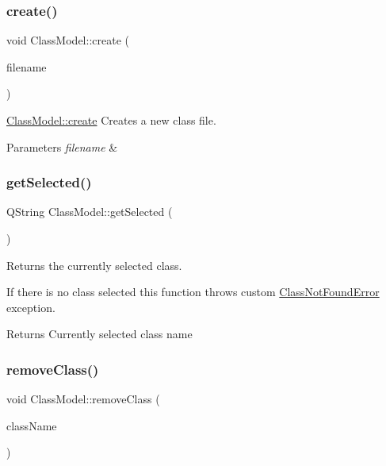 \subsubsection{\texorpdfstring{create()}{create()}}
{\footnotesize\ttfamily void Class\+Model\+::create (\begin{DoxyParamCaption}\item[{const Q\+String \&}]{filename }\end{DoxyParamCaption})}



\hyperlink{classClassModel_afb5c974408ff462e812df971588ea703}{Class\+Model\+::create} Creates a new class file. 


\begin{DoxyParams}{Parameters}
{\em filename} & \\
\hline
\end{DoxyParams}
\mbox{\label{classClassModel_ab7ca25c9d73597d671bfbb1c34f92461}} 
\subsubsection{\texorpdfstring{get\+Selected()}{getSelected()}}
{\footnotesize\ttfamily Q\+String Class\+Model\+::get\+Selected (\begin{DoxyParamCaption}{ }\end{DoxyParamCaption})}



Returns the currently selected class. 

If there is no class selected this function throws custom \hyperlink{classClassNotFoundError}{Class\+Not\+Found\+Error} exception.

\begin{DoxyReturn}{Returns}
Currently selected class name 
\end{DoxyReturn}
\mbox{\label{classClassModel_afe2266d404da4bab25bf193212fed198}} 
\subsubsection{\texorpdfstring{remove\+Class()}{removeClass()}}
{\footnotesize\ttfamily void Class\+Model\+::remove\+Class (\begin{DoxyParamCaption}\item[{const Q\+String \&}]{class\+Name }\end{DoxyParamCaption})}



